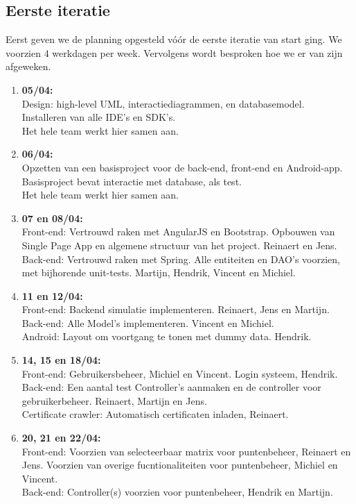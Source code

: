 \documentclass[a4paper]{article}
\begin{document}
\subsection{Eerste iteratie}
Eerst geven we de planning opgesteld vóór de eerste iteratie van start ging. We voorzien $4$ werkdagen per week. Vervolgens wordt besproken hoe we er van zijn afgeweken.
\begin{enumerate}[resume]
    \item \textbf{05/04:}\\
    Design: high-level UML, interactiediagrammen, en databasemodel.\\
    Installeren van alle IDE's en SDK's.\\
    Het hele team werkt hier samen aan.
    \item \textbf{06/04:}\\
    Opzetten van een basisproject voor de back-end, front-end en Android-app. Basisproject bevat interactie met database, als test.\\
    Het hele team werkt hier samen aan.
    \item \textbf{07 en 08/04:}\\
    Front-end: Vertrouwd raken met AngularJS en Bootstrap. Opbouwen van Single Page App en algemene structuur van het project. Reinaert en Jens.\\
    Back-end: Vertrouwd raken met Spring. Alle entiteiten en DAO's voorzien, met bijhorende unit-tests. Martijn, Hendrik, Vincent en Michiel.
    \item \textbf{11 en 12/04:}\\
    Front-end: Backend simulatie implementeren. Reinaert, Jens en Martijn.\\
    Back-end: Alle Model's implementeren. Vincent en Michiel.\\
    Android: Layout om voortgang te tonen met dummy data. Hendrik.
    \item \textbf{14, 15 en 18/04:}\\
    Front-end: Gebruikersbeheer, Michiel en Vincent. Login systeem, Hendrik.\\
    Back-end: Een aantal test Controller's aanmaken en de controller voor gebruikerbeheer. Reinaert, Martijn en Jens.\\
    Certificate crawler: Automatisch certificaten inladen, Reinaert.
    \item \textbf{20, 21 en 22/04:}\\
    Front-end: Voorzien van selecteerbaar matrix voor puntenbeheer, Reinaert en Jens. Voorzien van overige fucntionaliteiten voor puntenbeheer, Michiel en Vincent.\\
    Back-end: Controller(s) voorzien voor puntenbeheer, Hendrik en Martijn.\\
\end{enumerate}
\end{document}
